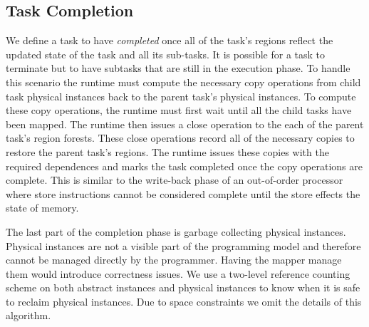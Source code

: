 \subsection{Task Completion}
\label{subsec:cleanup}
We define a task to have {\em completed} once all of the task's regions reflect
the updated state of the task and all its sub-tasks.  
It is possible for a task to terminate but to have subtasks that are still in the execution phase.
To handle this scenario the runtime must compute the necessary copy operations
from child task physical instances back to the parent task's physical instances.  To
compute these copy operations, the runtime must first wait until all the child tasks
have been mapped.  The runtime then issues a close operation to the each of the parent
task's region forests.  These close operations record all of the necessary copies to
restore the parent task's regions.  
The runtime issues these copies with the required dependences
and marks the task completed once the copy operations are complete.
This is similar to the write-back phase of an out-of-order processor where store instructions cannot be
considered complete until the store effects the state of memory.

The last part of the completion phase is garbage collecting physical instances.  Physical
instances are not a visible part of the programming model and therefore cannot be managed
directly by the programmer.  Having the mapper manage them would introduce correctness
issues.  We use a two-level reference counting scheme on both abstract instances and physical
instances to know when it is safe to reclaim physical instances.  Due to space constraints
we omit the details of this algorithm. 


